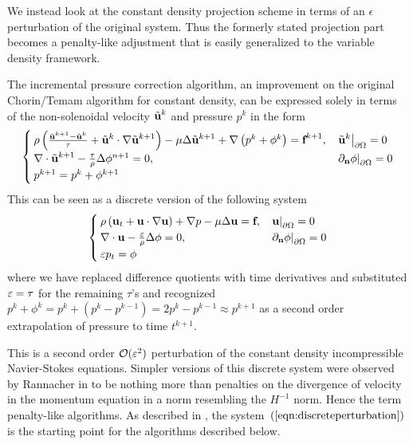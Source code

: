 \documentclass[letterpaper]{erdc}
\begin{document}
We instead look at the constant density projection scheme in terms of an $\epsilon$ perturbation of the original system. Thus the formerly stated projection part becomes a penalty-like adjustment that is easily generalized to the variable density framework.

The incremental pressure correction algorithm, an improvement on the original Chorin/Temam algorithm for constant density, can be expressed solely in terms of the non-solenoidal velocity $\tilde{\textbf{u}}^{k}$ and pressure $p^{k}$ in the form
\begin{equation}
  \begin{cases}
    \rho\left(\frac{\tilde{\textbf{u}}^{k+1} - \tilde{\textbf{u}}^{k}}{\tau} + \tilde{\textbf{u}}^{k}\cdot\nabla\tilde{\textbf{u}}^{k+1} \right) - \mu\Delta\tilde{\textbf{u}}^{k+1} + \nabla\left(p^{k} + \phi^{k}  \right) = \textbf{f}^{k+1}, & \left.\tilde{\textbf{u}}^{k}\right|_{\partial\Omega} = 0\\
    \nabla\cdot\tilde{\textbf{u}}^{k+1} - \frac{\tau}{\rho}\Delta\phi^{n+1}=0, &\left.\partial_{\textbf{n}} \phi\right|_{\partial\Omega} = 0\\
    p^{k+1} = p^{k} + \phi^{k+1}
  \end{cases}
\end{equation}
This can be seen as a discrete version of the following system   
\begin{equation}\label{eqn:discreteperturbation}
  \begin{cases}
    \rho\left(\textbf{u}_t + \textbf{u}\cdot\nabla\textbf{u}  \right) + \nabla p -\mu\Delta\textbf{u} = \textbf{f}, & \left.\textbf{u}\right|_{\partial\Omega} = 0\\
    \nabla\cdot\textbf{u} - \frac{\varepsilon}{\rho}\Delta \phi = 0,& \left.\partial_{\textbf{n}} \phi\right|_{\partial\Omega} = 0\\
    \varepsilon p_t = \phi
  \end{cases}
\end{equation}
where we have replaced difference quotients with time derivatives and substituted $\varepsilon = \tau$ for the remaining $\tau$'s and recognized $p^{k} + \phi^{k} = p^{k} + \left( p^{k} - p^{k-1} \right) = 2p^{k} - p^{k-1} \approx p^{k+1}$ as a second order extrapolation of pressure to time $t^{k+1}$.

This is a second order $\mathcal{O}(\varepsilon^2)$ perturbation of the constant density incompressible Navier-Stokes equations.  Simpler versions of this discrete system were observed by Rannacher in \cite{rannacher1992chorin} to be nothing more than penalties on the divergence of velocity in the momentum equation in a norm resembling the $H^{-1}$ norm.  Hence the term penalty-like algorithms.  As described in \cite{guermond2009splitting}, the system~$\left(\ref{eqn:discreteperturbation}\right)$ is the starting point for the algorithms described below.
\end{document}
